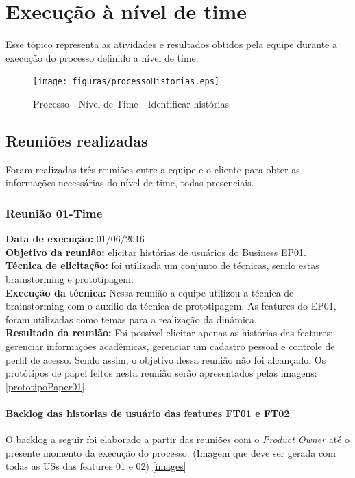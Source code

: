 \chapter[Execução à nível de time]{Execução à nível de time}

Esse tópico representa as atividades e resultados obtidos pela equipe durante a execução do processo definido a nível de time.

\begin{figure}[H]
    \centering
    \label{identificarHistorias}
    \texttt{[image: figuras/processoHistorias.eps]}
    \caption[Identificar histórias]{Processo - Nível de Time - Identificar histórias}
\end{figure}


\section{Reuniões realizadas}
Foram realizadas três reuniões entre a equipe e o cliente para obter as informações necessárias do nível de time, todas presenciais.

\subsection{Reunião 01-Time}

 \indent \textbf{Data de execução:} 01/06/2016\\
 \indent \textbf{Objetivo da reunião:} elicitar histórias de usuários do Business EP01.\\
 \indent \textbf{Técnica de elicitação:} foi utilizada um conjunto de técnicas, sendo estas brainstorming e prototipagem.\\
 \indent \textbf{Execução da técnica:} Nessa reunião a equipe utilizou a técnica de brainstorming com o auxilio da técnica de prototipagem. As features do EP01, foram utilizadas como temas para a realização da dinâmica.\\
 \indent \textbf{Resultado da reunião:} Foi possível elicitar apenas as histórias das features: gerenciar informações acadêmicas, gerenciar um cadastro pessoal e controle de perfil de acesso. Sendo assim, o objetivo dessa reunião não foi alcançado. Os protótipos de papel feitos nesta reunião serão apresentados pelas imagens: \ref{prototipoPaper01}.\\

\subsubsection{Backlog das historias de usuário das features FT01 e FT02}
 O backlog a seguir foi elaborado a partir das reuniões com o \textit{Product Owner} até o presente momento da execução do processo.
 (Imagem que deve ser gerada com todas as USs das features 01 e 02)
 \ref{images}


